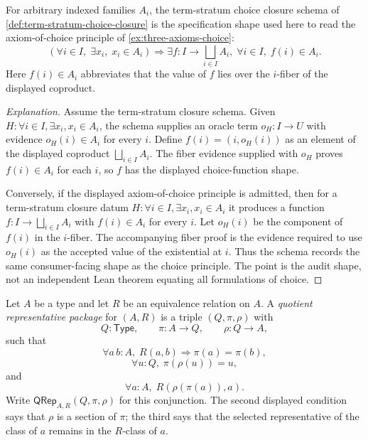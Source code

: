 \begin{principle}
\label{thm:choice-term-stratum-meta-closure}
For arbitrary indexed families $A_i$, the term-stratum choice closure schema of \autoref{def:term-stratum-choice-closure} is the specification shape used here to read the axiom-of-choice principle of \autoref{ex:three-axioms-choice}:
$$
\left(\forall i \in I,\; \exists x_i,\; x_i \in A_i\right)
\Longrightarrow
\exists f:I\to\bigsqcup_{i\in I} A_i,\; \forall i\in I,\; f(i)\in A_i.
$$
Here $f(i)\in A_i$ abbreviates that the value of $f$ lies over the $i$-fiber of the displayed coproduct.
\end{principle}

\begin{proof}[Explanation]
Assume the term-stratum closure schema. Given $H:\forall i\in I,\exists x_i, x_i\in A_i$, the schema supplies an oracle term $o_H:I\to U$ with evidence $o_H(i)\in A_i$ for every $i$. Define $f(i)=(i,o_H(i))$ as an element of the displayed coproduct $\bigsqcup_{i\in I}A_i$. The fiber evidence supplied with $o_H$ proves $f(i)\in A_i$ for each $i$, so $f$ has the displayed choice-function shape.

Conversely, if the displayed axiom-of-choice principle is admitted, then for a term-stratum closure datum $H:\forall i\in I,\exists x_i,x_i\in A_i$ it produces a function $f:I\to\bigsqcup_{i\in I}A_i$ with $f(i)\in A_i$ for every $i$. Let $o_H(i)$ be the component of $f(i)$ in the $i$-fiber. The accompanying fiber proof is the evidence required to use $o_H(i)$ as the accepted value of the existential at $i$. Thus the schema records the same consumer-facing shape as the choice principle. The point is the audit shape, not an independent Lean theorem equating all formulations of choice.
\end{proof}

\begin{definition}
\label{def:quotient-representative-package}
Let $A$ be a type and let $R$ be an equivalence relation on $A$. A \emph{quotient representative package} for $(A,R)$ is a triple $(Q,\pi,\rho)$ with
$$
Q:\mathsf{Type},\qquad \pi:A\to Q,\qquad \rho:Q\to A,
$$
such that
$$
\forall a\,b:A,\; R(a,b)\Longrightarrow \pi(a)=\pi(b),
$$
$$
\forall u:Q,\; \pi(\rho(u))=u,
$$
and
$$
\forall a:A,\; R(\rho(\pi(a)),a).
$$
Write $\mathsf{QRep}_{A,R}(Q,\pi,\rho)$ for this conjunction. The second displayed condition says that $\rho$ is a section of $\pi$; the third says that the selected representative of the class of $a$ remains in the $R$-class of $a$.
\end{definition}

